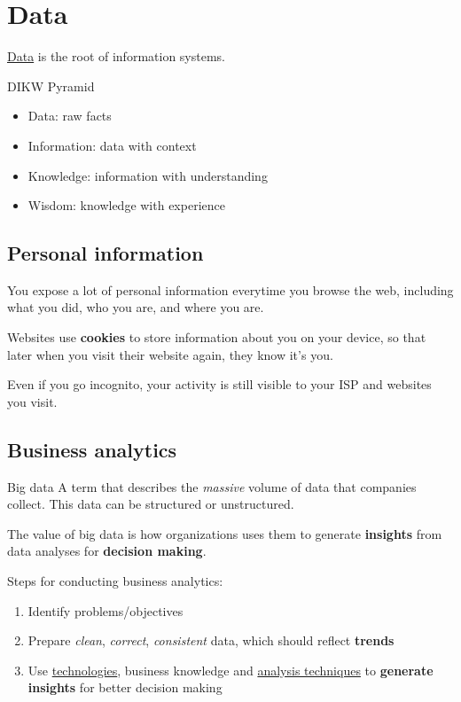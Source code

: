 \section{Data}

\hyperref[def:data]{Data} is the root of information systems.

\begin{definition}
    {DIKW Pyramid}
    \begin{itemize}
        \item Data: raw facts
        \item Information: data with context
        \item Knowledge: information with understanding
        \item Wisdom: knowledge with experience
    \end{itemize}
\end{definition}

\subsection{Personal information}

You expose a lot of personal information everytime you browse the web, including what you did, who you are, and where you are.

Websites use \textbf{cookies} to store information about you on your device, so that later when you visit their website again, they know it's you.

Even if you go incognito, your activity is still visible to your ISP and websites you visit.

\subsection{Business analytics}

\begin{definition}
    {Big data}
    A term that describes the \textit{massive} volume of data that companies collect. This data can be structured or unstructured.

    The value of big data is how organizations uses them to generate \textbf{insights} from data analyses for \textbf{decision making}.
\end{definition}

Steps for conducting business analytics:
\begin{enumerate}
    \item Identify problems/objectives
    \item Prepare \textit{clean}, \textit{correct}, \textit{consistent} data, which should reflect \textbf{trends}
    \item Use \hyperref[analysis:technology]{technologies}, business knowledge and \hyperref[analysis:technique]{analysis techniques} to \textbf{generate insights} for better decision making
\end{enumerate}

